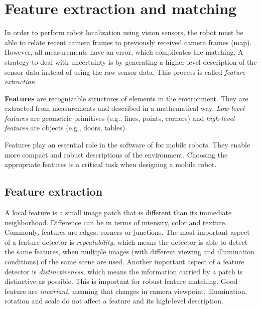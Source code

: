 \section{Feature extraction and matching}
\label{sec:computer-vision-feature-extraction-matching}
In order to perform robot localization using vision sensors, the robot must be able to relate recent camera frames to previously received camera frames (map).
However, all measurements have an error, which complicates the matching.
A strategy to deal with uncertainty is by generating a higher-level description of the sensor data instead of using the raw sensor data.
This process is called \textit{feature extraction}.

\begin{mydef}
\textbf{Features} are recognizable structures of elements in the environment.
They are extracted from measurements and described in a mathematical way.
\textit{Low-level features} are geometric primitives (e.g., lines, points, corners) and \textit{high-level features} are objects (e.g., doors, tables).
\end{mydef}

Features play an essential role %
in the software of for mobile robots.
They enable more compact and robust descriptions of the environment.
Choosing the appropriate features is a critical task when designing a mobile robot.

\subsection{Feature extraction}
\label{sec:background-feature-extraction}
A local feature is a small image patch that is different than its immediate neighborhood.
Difference can be in terms of intensity, color and texture.
Commonly, features are edges, corners or junctions.
The most important aspect of a feature detector is \textit{repeatability}, which means the detector is able to detect the same features, when multiple images (with different viewing and illumination conditions) of the same scene are used.
Another important aspect of a feature detector is \textit{distinctiveness}, which means the information carried by a patch is distinctive as possible.
This is important for robust feature matching.
Good feature are \textit{invariant}, meaning that changes in camera viewpoint, illumination, rotation and scale do not affect a feature and its high-level description.

